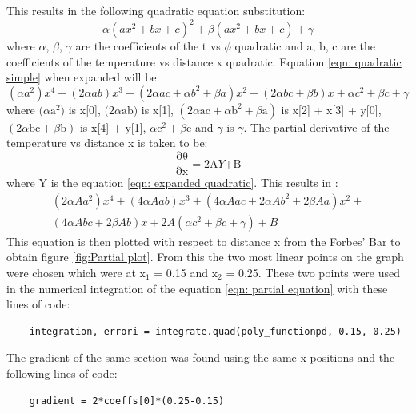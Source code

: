 \documentclass[12pt, a4paper]{article}
\begin{document}
This results in the following quadratic equation substitution:
\begin{equation}\label{eqn: quadratic simple}
    \alpha(ax^2 + bx + c)^2 + \beta(ax^2 + bx + c) + \gamma
\end{equation}
where $\alpha$, $\beta$, $\gamma$ are the coefficients of the t vs $\phi$ quadratic and a, b, c are the coefficients of the temperature vs distance x quadratic.
Equation \ref{eqn: quadratic simple} when expanded will be:
\begin{equation}\label{eqn: expanded quadratic}
    (\alpha a^2)x^4 + (2\alpha ab)x^3 + (2 \alpha ac + \alpha b^2 +\beta a)x^2 + (2\alpha bc + \beta b)x + \alpha c^2 + \beta c + \gamma
\end{equation}
where $(\alpha$$\mathrm{a^2})$ is x[0], $(2\alpha$$\mathrm{ab})$ is x[1], $(2 \alpha \mathrm{ac} + \alpha\mathrm{b}^2 +\beta \mathrm{a})$ is x[2] + x[3] + y[0], $(2\alpha \mathrm{bc} + \beta \mathrm{b})$ is x[4] + y[1], $\alpha \mathrm{c}^2 + \beta \mathrm{c}$ and $\gamma$ is $\gamma$. The partial derivative of the temperature vs distance x is taken to be:
\begin{equation}\label{eqn: partial equation}
    \mathrm{\frac{\partial \theta}{\partial x} = 2A}Y \mathrm{+ B}
\end{equation}
where Y is the equation \ref{eqn: expanded quadratic}. This results in :
\begin{multline}
    (2 \alpha Aa^2)x^4 + (4 \alpha Aab)x^3 + (4 \alpha Aac + 2 \alpha Ab^2 + 2\beta Aa)x^2 +\\
    (4 \alpha Abc + 2 \beta Ab)x + 2A(\alpha c^2 + \beta c + \gamma) + B
\end{multline}
This equation is then plotted with respect to distance x from the Forbes' Bar to obtain figure \ref{fig:Partial plot}. From this the two most linear points on the graph were chosen which were at $\mathrm{x}_1$ = 0.15 and $\mathrm{x}_2$ = 0.25. These two points were used in the numerical integration of the equation \ref{eqn: partial equation} with these lines of code:
\begin{verbatim}
    integration, errori = integrate.quad(poly_functionpd, 0.15, 0.25)
\end{verbatim}
The gradient of the same section was found using the same x-positions and the following lines of code:
\begin{verbatim}
    gradient = 2*coeffs[0]*(0.25-0.15)
\end{verbatim}
\end{document}
